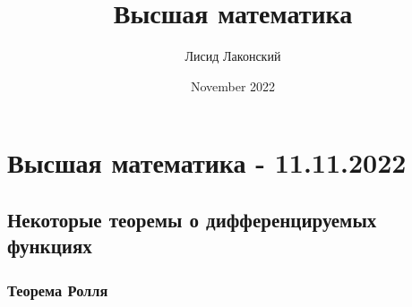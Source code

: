 \documentclass{article}
\title{Высшая математика}
\author{Лисид Лаконский}
\date{November 2022}
\begin{document}
\maketitle

\tableofcontents
\pagebreak

\section{Высшая математика - 11.11.2022}

\subsection{Некоторые теоремы о дифференцируемых функциях}

\subsubsection{Теорема Ролля}
\end{document}
